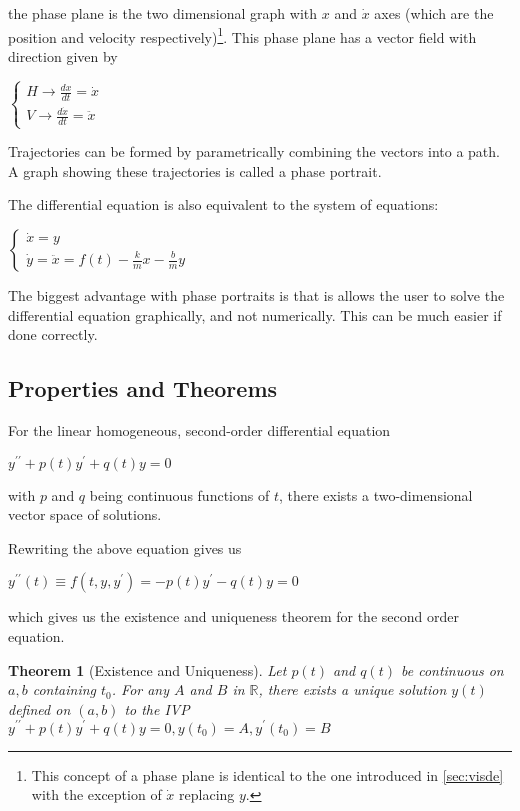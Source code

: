 \documentclass[12pt,landscape,twocolumn]{article}
\newtheorem{thm}{Theorem}
\begin{document}
        the phase plane is the two dimensional graph with $x$ and $\dot{x}$ axes (which are the position and velocity respectively)\footnote{This concept of a phase plane is identical to the one introduced in \eqref{sec:visde} with the exception of $\dot{x}$ replacing $y$.}. This phase plane has a vector field with direction given by

            $ \begin{cases}
                    H \to \frac{dx}{dt} = \dot{x}\\
                    V \to \frac{d\dot{x} }{dt} = \ddot{x}
                \end{cases} $

        Trajectories can be formed by parametrically combining the vectors into a path. A graph showing these trajectories is called a phase portrait.

        The differential equation is also equivalent to the system of equations:

            $ \begin{cases}
                    \dot{x} = y\\
                    \dot{y} = \ddot{x} = f(t) - \frac{k}{m} x - \frac{b}{m} y
                \end{cases} $

        The biggest advantage with phase portraits is that is allows the user to solve the differential equation graphically, and not numerically. This can be much easier if done correctly.

    \subsection{Properties and Theorems}
    For the linear homogeneous, second-order differential equation

        $
            y^{\prime\prime} + p(t) y^\prime + q(t)y = 0
        $

    with $p$ and $q$ being continuous functions of $t$, there exists a two-dimensional vector space of solutions.

    Rewriting the above equation gives us

        $
            y^{\prime\prime}(t) \equiv f(t, y, y^\prime) = -p(t) y^\prime - q(t) y = 0
        $

    which gives us the existence and uniqueness theorem for the second order equation.

        \begin{thm}[Existence and Uniqueness]\label{thm:2eau}
            Let $p(t)$ and $q(t)$ be continuous on $a, b$ containing $t_0$. For any $A$ and $B$ in $\mathbb{R}$, there exists a unique solution $y(t)$ defined on $(a, b)$ to the IVP
            $
            y^{\prime\prime} + p(t) y^\prime + q(t)y = 0, y(t_0) = A, y^\prime(t_0) = B
            $
        \end{thm}
\end{document}
